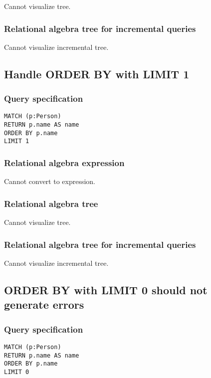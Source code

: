 Cannot visualize tree.

\subsubsection*{Relational algebra tree for incremental queries}

Cannot visualize incremental tree.

\subsection{Handle ORDER BY with LIMIT 1}

\subsubsection*{Query specification}

\begin{lstlisting}
MATCH (p:Person)
RETURN p.name AS name
ORDER BY p.name
LIMIT 1
\end{lstlisting}

\subsubsection*{Relational algebra expression}

Cannot convert to expression.

\subsubsection*{Relational algebra tree}

Cannot visualize tree.

\subsubsection*{Relational algebra tree for incremental queries}

Cannot visualize incremental tree.

\subsection{ORDER BY with LIMIT 0 should not generate errors}

\subsubsection*{Query specification}

\begin{lstlisting}
MATCH (p:Person)
RETURN p.name AS name
ORDER BY p.name
LIMIT 0
\end{lstlisting}

